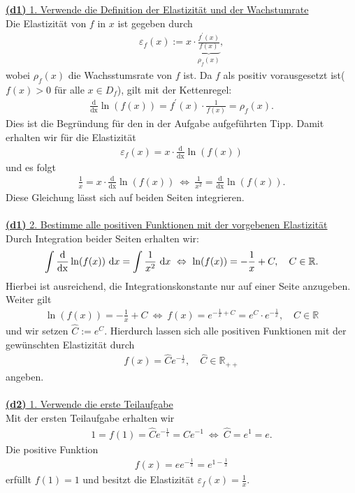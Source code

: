 \underline{\textbf{(d1)} 1. Verwende die Definition der Elastizität und der Wachstumrate}\\
Die Elastizität von $ f $ in $ x $ ist gegeben durch
\begin{align*}
	\varepsilon_f(x) := x \cdot \underbrace{\frac{f^\prime(x)}{f(x)}}_{\rho_f(x)},
\end{align*} 
wobei $ \rho_f(x) $ die Wachsstumsrate von $ f $ ist. 
Da $ f $ als positiv vorausgesetzt ist($ f(x) > 0$ für alle $ x \in D_f $), gilt mit der Kettenregel:
\begin{align*}
	\frac{\mathrm{d}}{\mathrm{dx}}\ln(f(x))
	=f^\prime(x) \cdot \frac{1}{f(x)} = \rho_f(x).
\end{align*}
Dies ist die Begründung für den in der Aufgabe aufgeführten Tipp. Damit erhalten wir für die Elastizität
\begin{align*}
	\varepsilon_f(x) = x \cdot \frac{\mathrm{d}}{\mathrm{dx}}\ln(f(x))
\end{align*} 
und es folgt
\begin{align*}
	\frac{1}{x} =  x \cdot \frac{\mathrm{d}}{\mathrm{dx}}\ln(f(x))
	\ \Leftrightarrow \
	\frac{1}{x^2} = \frac{\mathrm{d}}{\mathrm{dx}}\ln(f(x)).
\end{align*}
Diese Gleichung lässt sich auf beiden Seiten integrieren.\\
\\
\underline{\textbf{(d1)} 2. Bestimme alle positiven Funktionen mit der vorgebenen Elastizität}\\
Durch Integration beider Seiten erhalten wir:
\begin{align*}
	\int \frac{\mathrm{d}}{\mathrm{dx}}\ln(f(x)) \ \text{\rmfamily d} x
	=
	\int \frac{1}{x^2} \ \text{\rmfamily d} x
	\ \Leftrightarrow \
	\ln(f(x)) = - \frac{1}{x} + C, \quad C \in \mathbb{R}.
\end{align*}
Hierbei ist ausreichend, die Integrationskonstante nur auf einer Seite anzugeben. Weiter gilt
\begin{align*}
	\ln(f(x)) = - \frac{1}{x} + C
	\ \Leftrightarrow \
	f(x) = e^{-\frac{1}{x} + C} = e^C \cdot e^{-\frac{1}{x}} , \quad C \in \mathbb{R}
\end{align*}
und wir setzen $ \hat{C} := e^{C} $. Hierdurch lassen sich alle positiven Funktionen mit der gewünschten Elastizität durch
\begin{align*}
	f(x) = \hat{C} e^{-\frac{1}{x}}, \quad \hat{C} \in \mathbb{R}_{++}
\end{align*}
angeben.\\
\\
\underline{\textbf{(d2)} 1. Verwende die erste Teilaufgabe}\\
Mit der ersten Teilaufgabe erhalten wir
\begin{align*}
	1 =f(1) = \hat{C} e^{-\frac{1}{1} } = \hat{C} e^{-1}
	\ \Leftrightarrow \
	\hat{C} =e^{1} = e.
\end{align*}
Die positive Funktion
\begin{align*}
	f(x) = e e^{-\frac{1}{x}} = e^{1-\frac{1}{x}} 
\end{align*}
erfüllt $ f(1)  = 1$ und besitzt die Elastizität $ \varepsilon_f(x) = \frac{1}{x} $.

\newpage

